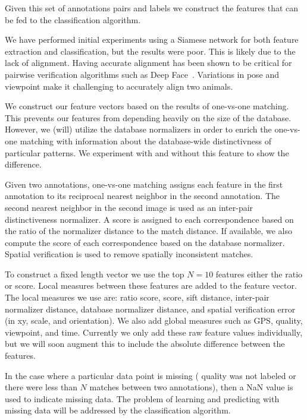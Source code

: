 Given this set of annotations pairs and labels we construct the features that
  can be fed to the classification algorithm.

We have performed initial experiments using a Siamese network for both feature
  extraction and classification, but the results were poor.
This is likely due to the lack of alignment.
Having accurate alignment has been shown to be critical for pairwise
  verification algorithms such as Deep Face~\cite{taigman_deepface_2014}.
Variations in pose and viewpoint make it challenging to accurately align two
  animals.

We construct our feature vectors based on the results of one-vs-one matching.
This prevents our features from depending heavily on the size of the database.
However, we (will) utilize the database normalizers in order to enrich the
  one-vs-one matching with information about the database-wide distinctivness of
  particular patterns.
We experiment with and without this feature to show the difference.


Given two annotations, one-vs-one matching assigns each feature in the first
  annotation to its reciprocal nearest neighbor in the second annotation.
The second nearest neighbor in the second image is used as an inter-pair
  distinctiveness normalizer.
A score is assigned to each correspondence based on the ratio of the
  normalizer distance to the match distance.
If available, we also compute the \LNBNN{} score of each correspondence based
  on the database normalizer.
Spatial verification is used to remove spatially inconsistent matches.

To construct a fixed length vector we use the top $N=10$ features \wrt{}
  either the ratio or \LNBNN{} score.
Local measures between these features are added to the feature vector.
The local measures we use are:
ratio score, \LNBNN{} score, sift distance, inter-pair normalizer distance,
  database normalizer distance, and spatial verification error (in xy, scale,
  and orientation).
We also add global measures such as GPS, quality, viewpoint, and time.
Currently we only add these raw feature values individually, but we will soon
  augment this to include the absolute difference between the features.

In the case where a particular data point is missing (\ie{} quality was not
  labeled or there were less than $N$ matches between two annotations), then a
  NaN value is used to indicate missing data.
The problem of learning and predicting with missing data will be addressed by
  the classification algorithm.


